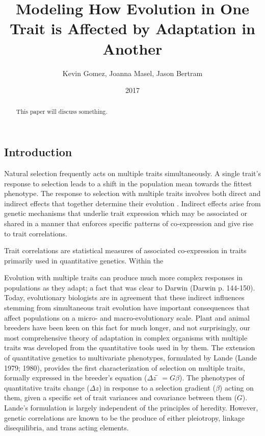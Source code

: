 \documentclass[11pt,one column]{article}
\begin{document}
\begin{multicols}{2}

\title{Modeling How Evolution in One Trait is Affected by Adaptation in Another}
\author{Kevin Gomez, Joanna Masel, Jason Bertram}
\date{2017}
\maketitle

\begin{abstract}
This paper will discuss something.
\end{abstract}

\section*{Introduction}
Natural selection frequently acts on multiple traits simultaneously. A single trait’s response to selection leads to a shift in the population mean towards the fittest phenotype.  The response to selection with multiple traits involves both direct and indirect effects that together determine their evolution \cite{Scarcelli23102007,Lovell2013,Wagner2011}.  Indirect effects arise from genetic mechanisms that underlie trait expression which may be associated or shared in a manner that enforces specific patterns of co-expression and give rise to trait correlations.\par

Trait correlations are statistical measures of associated co-expression in traits primarily used in quantitative genetics.  Within the 



Evolution with multiple traits can produce much more complex responses in populations as they adapt; a fact that was clear to Darwin (Darwin p. 144-150).  Today, evolutionary biologists are in agreement that these indirect influences stemming from simultaneous trait evolution have important consequences that affect populations on a micro- and macro-evolutionary scale.  Plant and animal breeders have been keen on this fact for much longer, and not surprisingly, our most comprehensive theory of adaptation in complex organisms with multiple traits was developed from the quantitative tools used in by them.  The extension of quantitative genetics to multivariate phenotypes, formulated by Lande (Lande 1979; 1980), provides the first characterization of selection on multiple traits, formally expressed in the breeder’s equation ($\Delta z ̅=G \beta$). The phenotypes of quantitative traits change ($\Delta z$) in response to a selection gradient ($\beta$) acting on them, given a specific set of trait variances and covariance between them ($G$). Lande’s formulation is largely independent of the principles of heredity.  However, genetic correlations are known to be the produce of either pleiotropy, linkage disequilibria, and trans acting elements.\par


\end{multicols}
\end{document}
